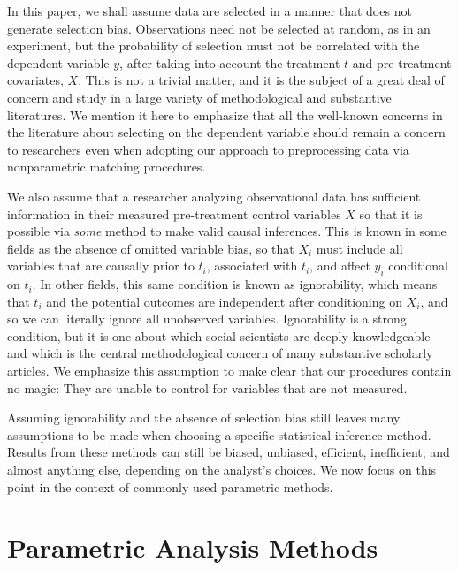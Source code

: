 \documentclass[11pt,titlepage]{article}
\begin{document}
In this paper, we shall assume data are selected in a manner that does
not generate selection bias.  Observations need not be selected at
random, as in an experiment, but the probability of selection must not
be correlated with the dependent variable $y$, after taking into
account the treatment $t$ and pre-treatment covariates, $X$.  This is
not a trivial matter, and it is the subject of a great deal of concern
and study in a large variety of methodological and substantive
literatures.  We mention it here to emphasize that all the well-known
concerns in the literature about selecting on the dependent variable
should remain a concern to researchers even when adopting our approach
to preprocessing data via nonparametric matching procedures.

We also assume that a researcher analyzing observational data has
sufficient information in their measured pre-treatment control
variables $X$ so that it is possible via \emph{some} method to make
valid causal inferences.  This is known in some fields as the absence
of omitted variable bias, so that $X_i$ must include all variables
that are causally prior to $t_i$, associated with $t_i$, and affect
$y_i$ conditional on $t_i$.  In other fields, this same condition is
known as ignorability, which means that $t_i$ and the potential
outcomes are independent after conditioning on $X_i$, and so we can
literally ignore all unobserved variables.  Ignorability is a strong
condition, but it is one about which social scientists are deeply
knowledgeable and which is the central methodological concern of many
substantive scholarly articles.  We emphasize this assumption to make
clear that our procedures contain no magic: They are unable to control
for variables that are not measured.

Assuming ignorability and the absence of selection bias still leaves
many assumptions to be made when choosing a specific statistical
inference method.  Results from these methods can still be biased,
unbiased, efficient, inefficient, and almost anything else, depending
on the analyst's choices.  We now focus on this point in the context
of commonly used parametric methods.

\section{Parametric Analysis Methods}
\end{document}
